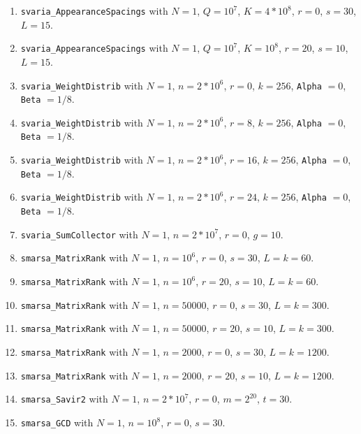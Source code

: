 \begin{enumerate}
  \item {\tt svaria\_AppearanceSpacings} with $N=1$,  $Q=10^7$, $K=4*10^8$,
   $r=0$,  $s=30$, $L=15$.

  \item {\tt svaria\_AppearanceSpacings} with $N=1$,  $Q=10^7$, $K=10^8$,
   $r=20$,  $s=10$, $L=15$.

  \item {\tt svaria\_WeightDistrib} with $N=1$, $n=2*10^6$, $r=0$, $k=256$,
   {\tt Alpha} $=0$,  {\tt Beta} $=1/8$.

  \item {\tt svaria\_WeightDistrib} with $N=1$, $n=2*10^6$, $r=8$, $k=256$,
   {\tt Alpha} $=0$,  {\tt Beta} $=1/8$.

  \item {\tt svaria\_WeightDistrib} with $N=1$, $n=2*10^6$, $r=16$, $k=256$,
   {\tt Alpha} $=0$,  {\tt Beta} $=1/8$.

  \item {\tt svaria\_WeightDistrib} with $N=1$, $n=2*10^6$, $r=24$, $k=256$,
   {\tt Alpha} $=0$,  {\tt Beta} $=1/8$.

  \item {\tt svaria\_SumCollector} with $N=1$, $n=2*10^7$, $r=0$,  $g=10$.

  \item {\tt smarsa\_MatrixRank} with $N=1$, $n=10^6$, $r=0$,
   $s=30$, $L=k=60$.

  \item {\tt smarsa\_MatrixRank} with $N=1$, $n=10^6$, $r=20$,
   $s=10$, $L=k=60$.

  \item {\tt smarsa\_MatrixRank} with $N=1$, $n=50000$, $r=0$,
   $s=30$, $L=k=300$.

  \item {\tt smarsa\_MatrixRank} with $N=1$, $n=50000$, $r=20$,
   $s=10$, $L=k=300$.

  \item {\tt smarsa\_MatrixRank} with $N=1$, $n=2000$, $r=0$,
   $s=30$, $L=k=1200$.

  \item {\tt smarsa\_MatrixRank} with $N=1$, $n=2000$, $r=20$,
   $s=10$, $L=k=1200$.

  \item {\tt smarsa\_Savir2} with $N=1$, $n=2*10^7$, $r=0$, $m=2^{20}$, $t=30$.

  \item {\tt smarsa\_GCD} with $N=1$, $n=10^8$, $r=0$, $s=30$.


\end{enumerate}
